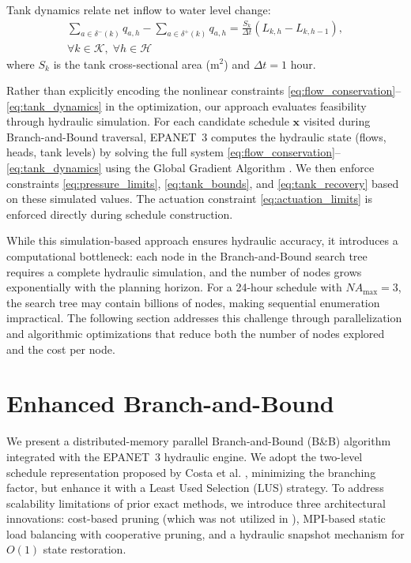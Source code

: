 \documentclass[a4paper,fleqn]{cas-dc}
\begin{document}
Tank dynamics relate net inflow to water level change:
\begin{multline}
	\sum_{a \in \delta^-(k)} q_{a,h} - \sum_{a \in \delta^+(k)} q_{a,h} = \frac{S_k}{\Delta t} (L_{k,h} - L_{k,h-1}), \\
	\forall k \in \mathcal{K}, \; \forall h \in \mathcal{H}
	\label{eq:tank_dynamics}
\end{multline}
where $S_k$ is the tank cross-sectional area (m$^2$) and $\Delta t = 1$ hour.

Rather than explicitly encoding the nonlinear constraints \eqref{eq:flow_conservation}--\eqref{eq:tank_dynamics} in the optimization, our approach evaluates feasibility through hydraulic simulation. For each candidate schedule $\mathbf{x}$ visited during Branch-and-Bound traversal, EPANET~3 computes the hydraulic state (flows, heads, tank levels) by solving the full system \eqref{eq:flow_conservation}--\eqref{eq:tank_dynamics} using the Global Gradient Algorithm \cite{Todini1988}. We then enforce constraints \eqref{eq:pressure_limits}, \eqref{eq:tank_bounds}, and \eqref{eq:tank_recovery} based on these simulated values. The actuation constraint \eqref{eq:actuation_limits} is enforced directly during schedule construction.

While this simulation-based approach ensures hydraulic accuracy, it introduces a computational bottleneck: each node in the Branch-and-Bound search tree requires a complete hydraulic simulation, and the number of nodes grows exponentially with the planning horizon. For a 24-hour schedule with $NA_{\max}=3$, the search tree may contain billions of nodes, making sequential enumeration impractical. The following section addresses this challenge through parallelization and algorithmic optimizations that reduce both the number of nodes explored and the cost per node.

\section{Enhanced Branch-and-Bound}

We present a distributed-memory parallel Branch-and-Bound (B\&B) algorithm integrated with the EPANET~3 hydraulic engine. We adopt the two-level schedule representation proposed by Costa et al. \cite{Costa2016}, minimizing the branching factor, but enhance it with a Least Used Selection (LUS) strategy. To address scalability limitations of prior exact methods, we introduce three architectural innovations: cost-based pruning (which was not utilized in \cite{Costa2016}), MPI-based static load balancing with cooperative pruning, and a hydraulic snapshot mechanism for $O(1)$ state restoration.
\end{document}
